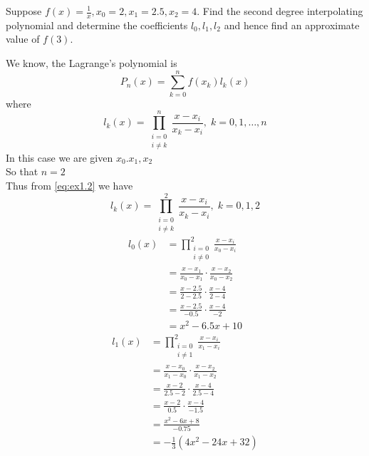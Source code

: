 \documentclass[12pt,class=book,crop=false]{standalone}
\begin{document}
\begin{prob}
    Suppose \(  f(x)=\frac{1}{x}, x_0=2, x_1=2.5, x_2=4 \). Find the second degree interpolating polynomial and determine the coefficients \(  l_0,l_1,l_2 \) and hence find an approximate value of \(  f(3) \).
\end{prob}
\begin{soln}
    We know, the Lagrange's polynomial is
    \begin{equation}
        P_n(x)=\sum_{k=0}^nf(x_k)l_k(x)\label{eq:ex1.1}
    \end{equation}
    where
    \begin{equation}
        l_k(x)=\prod_{\substack{i=0\\ i\neq k}}^n\frac{x-x_i}{x_k-x_i},\; k=0,1,\dots,n\label{eq:ex1.2}
    \end{equation}
    In this case we are given \(  x_0.x_1,x_2 \)\\
    So that \(  n=2 \)\\
    Thus from \ref{eq:ex1.2} we have
    \[l_k(x)=\prod_{\substack{i=0\\ i\neq k}}^2\frac{x-x_i}{x_k-x_i},\; k=0,1,2\]
    \begin{align*}
        l_0(x) & = \prod_{\substack{i=0                            \\ i\neq 0}}^2\frac{x-x_i}{x_0-x_i}\\
               & =\frac{x-x_1}{x_0-x_1}\cdot \frac{x-x_2}{x_0-x_2} \\
               & = \frac{x-2.5}{2-2.5}\cdot \frac{x-4}{2-4}        \\
               & = \frac{x-2.5}{-0.5}\cdot \frac{x-4}{-2}          \\
               & = x^2-6.5x+10
    \end{align*}
    \begin{align*}
        l_1(x) & = \prod_{\substack{i=0                            \\ i\neq 1}}^2\frac{x-x_i}{x_1-x_i}\\
               & =\frac{x-x_0}{x_1-x_0}\cdot \frac{x-x_2}{x_1-x_2} \\
               & = \frac{x-2}{2.5-2}\cdot \frac{x-4}{2.5-4}        \\
               & = \frac{x-2}{0.5}\cdot \frac{x-4}{-1.5}           \\
               & = \frac{x^2-6x+8}{-0.75}                          \\
               & = -\frac{1}{3}(4x^2-24x+32)
    \end{align*}

\end{soln}
\end{document}
